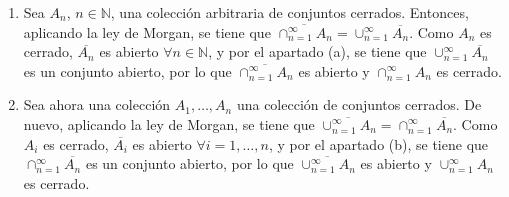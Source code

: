 \documentclass[
  spanish,
  a4paper,
]{scrreport}
\theoremstyle{definition}
\theoremstyle{remark}
\begin{document}
\begin{tcolorbox}
\begin{enumerate}
  Sea ahora una colección \(A_1,\ldots,A_m,A_{m+1}\) una colección de
  conjuntos abiertos y supongamos que \(A=\cap_{n=1}^m A_n\) es un
  conjunto abierto. Si \(A\cap A_{m+1}=\emptyset\) ya estaría probado.
  En caso contrario, sea \(x\in A\cap A_{m+1}\). Entonces, como
  \(x\in A\) existe un \(\varepsilon_1>0\) tal que el entorno
  \((x-\varepsilon_1, x+\varepsilon_1)\subseteq A\), y como
  \(x\in A_{m+1}\) existe un \(\varepsilon_2>0\) tal que el entorno
  \((x-\varepsilon_2, x+\varepsilon_2)\subseteq A_{m+1}\). Tomando
  \(\varepsilon=\min\{\varepsilon_1,\varepsilon_2\}\), se tiene que
  \((x-\varepsilon, x+\varepsilon)\subseteq A\) y
  \((x-\varepsilon, x+\varepsilon)\subseteq A_{m+1}\), por lo que
  \((x-\varepsilon, x+\varepsilon)\subseteq A\cap A_{m+1}\), y
  \(\cap_{n=1}^{m+1} A_n\) es un conjunto abierto.
\item
  Sea \(A_n\), \(n\in\mathbb{N}\), una colección arbitraria de conjuntos
  cerrados. Entonces, aplicando la ley de Morgan, se tiene que
  \(\overline{\cap_{n=1}^\infty A_n}= \cup_{n=1}^\infty \overline{A_n}\).
  Como \(A_n\) es cerrado, \(\overline{A_n}\) es abierto
  \(\forall n\in\mathbb{N}\), y por el apartado (a), se tiene que
  \(\cup_{n=1}^\infty \overline{A_n}\) es un conjunto abierto, por lo
  que \(\overline{\cap_{n=1}^\infty A_n}\) es abierto y
  \(\cap_{n=1}^\infty A_n\) es cerrado.
\item
  Sea ahora una colección \(A_1,\ldots,A_n\) una colección de conjuntos
  cerrados. De nuevo, aplicando la ley de Morgan, se tiene que
  \(\overline{\cup_{n=1}^\infty A_n}= \cap_{n=1}^\infty \overline{A_n}\).
  Como \(A_i\) es cerrado, \(\overline{A_i}\) es abierto
  \(\forall i=1, \ldots, n\), y por el apartado (b), se tiene que
  \(\cap_{n=1}^\infty \overline{A_n}\) es un conjunto abierto, por lo
  que \(\overline{\cup_{n=1}^\infty A_n}\) es abierto y
  \(\cup_{n=1}^\infty A_n\) es cerrado.
\end{enumerate}

\end{tcolorbox}
\end{document}
